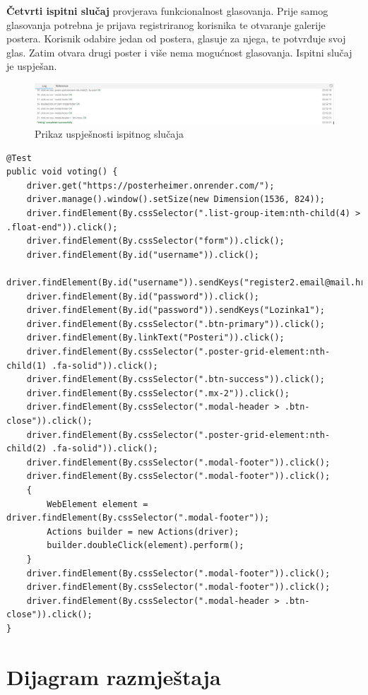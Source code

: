 		\textbf{Četvrti ispitni slučaj} provjerava funkcionalnost glasovanja. Prije samog glasovanja potrebna je prijava registriranog korisnika te otvaranje galerije postera. Korisnik odabire jedan od postera, glasuje za njega, te potvrđuje svoj glas. Zatim otvara drugi poster i više nema mogućnost glasovanja. Ispitni slučaj je uspješan.
		\begin{figure} [hbt!]
			\includegraphics[width=\linewidth]{Slike/votingTest}
			\caption{Prikaz uspješnosti ispitnog slučaja}
		\end{figure}
		
		\begin{lstlisting}
@Test
public void voting() {
	driver.get("https://posterheimer.onrender.com/");
	driver.manage().window().setSize(new Dimension(1536, 824));
	driver.findElement(By.cssSelector(".list-group-item:nth-child(4) > .float-end")).click();
	driver.findElement(By.cssSelector("form")).click();
	driver.findElement(By.id("username")).click();
	driver.findElement(By.id("username")).sendKeys("register2.email@mail.hr");
	driver.findElement(By.id("password")).click();
	driver.findElement(By.id("password")).sendKeys("Lozinka1");
	driver.findElement(By.cssSelector(".btn-primary")).click();
	driver.findElement(By.linkText("Posteri")).click();
	driver.findElement(By.cssSelector(".poster-grid-element:nth-child(1) .fa-solid")).click();
	driver.findElement(By.cssSelector(".btn-success")).click();
	driver.findElement(By.cssSelector(".mx-2")).click();
	driver.findElement(By.cssSelector(".modal-header > .btn-close")).click();
	driver.findElement(By.cssSelector(".poster-grid-element:nth-child(2) .fa-solid")).click();
	driver.findElement(By.cssSelector(".modal-footer")).click();
	driver.findElement(By.cssSelector(".modal-footer")).click();
	{
		WebElement element = driver.findElement(By.cssSelector(".modal-footer"));
		Actions builder = new Actions(driver);
		builder.doubleClick(element).perform();
	}
	driver.findElement(By.cssSelector(".modal-footer")).click();
	driver.findElement(By.cssSelector(".modal-footer")).click();
	driver.findElement(By.cssSelector(".modal-header > .btn-close")).click();
}
		\end{lstlisting}
			
			\eject 
		
		
		\section{Dijagram razmještaja}
			 
